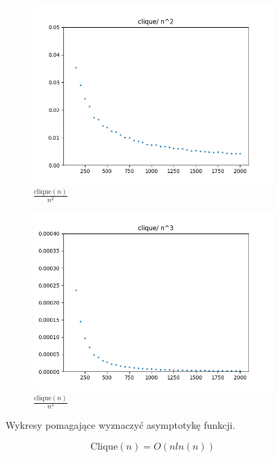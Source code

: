 \documentclass{article}
\begin{document}
\begin{figure}[H]
\begin{subfigure}{.475\textwidth}
    \includegraphics[width=\textwidth]{clique_nn.png}
    \caption{\( \frac{\text{clique}(n)}{n^2} \)}
    \label{fig:clique_nn}
  \end{subfigure}%
  \begin{subfigure}{.475\textwidth}
    \centering
    \includegraphics[width=\textwidth]{clique_nnn.png}
    \caption{\( \frac{\text{clique}(n)}{n^3} \)}
    \label{fig:clique_nnn}
  \end{subfigure}%
  \caption{Wykresy pomagające wyznaczyć asymptotykę funkcji.}
\end{figure}
\[\text{Clique}(n)=O(nln(n))\]
\end{document}

